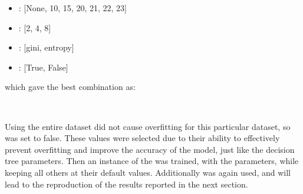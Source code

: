 \begin{center}
    \begin{minipage}{4in}
\begin{itemize}
    \item {}: [None, 10, 15, 20, 21, 22, 23]
    \item {}: [2, 4, 8]
    \item {}: [gini, entropy]
    \item {}: [True, False] \\
\end{itemize}
            \end{minipage}
\end{center}

which gave the best combination as:\\

\begin{tcolorbox}[colback=white,
                  arc=0pt,
                outer=0pt]
\centering {} \, \,  \, \,  \, \, \\
   \end{tcolorbox}


Using the entire dataset did not cause overfitting for this particular dataset, so  was set to false.
These values were selected due to their ability to effectively prevent overfitting and improve the accuracy of the model, just like the decision tree parameters.
Then an instance of the  was trained, with the parameters, while keeping all others at their default values.
Additionally  was again used, and will lead to the reproduction of the results reported in the next section.


